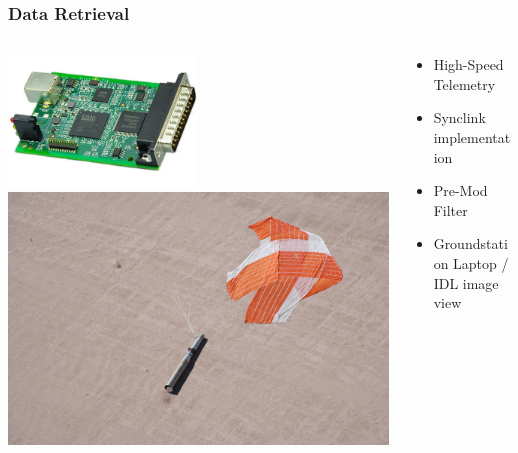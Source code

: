 \documentclass[landscape,xcolor={table}]{beamer}
\begin{document}
	\begin{frame}
		
		\frametitle{Data Retrieval}
		
		\begin{columns}[T] %
		\begin{column}{.49\textwidth}

			\includegraphics[width=0.5\textwidth]{images/synclink} \\
			\includegraphics[width=\textwidth]{images/desert}
			
		\end{column}%
		\hfill%
		\begin{column}{.49\textwidth}

			\begin{itemize}
				\item High-Speed Telemetry
				\item Synclink implementation
				\item Pre-Mod Filter
				\item Groundstation Laptop / IDL image view
		  	\end{itemize}
					
		\end{column}%
		\end{columns}

	\end{frame}
	
\end{document}
